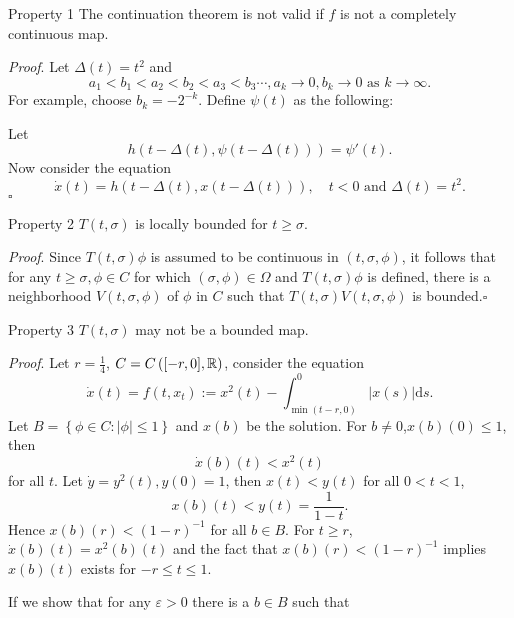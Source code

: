\begin{frame}[t]
  \begin{alertblock}{Property 1}
     The continuation theorem is not valid if $f$ is not a completely continuous map.
   \end{alertblock}
   {\noindent\itshape Proof}.
   Let $\Delta(t)=t^2$ and 
   \[
   a_1<b_1<a_2<b_2<a_3<b_3\cdots, a_k\to 0, b_k\to 0 \text{ as }k\to \infty.
   \] 
   For example, choose $b_k=-2^{-k}$.
   Define $\psi(t)$ as the following:
   \begin{figure}
     \centering
   \end{figure}
 \end{frame}
 \begin{frame}[t]
   Let 
   \[
     h(t-\Delta(t),\psi(t-\Delta(t)))=\psi'(t).
   \] 
   Now consider the equation 
   \[
     \dot{x}(t)=h(t-\Delta(t),x(t-\Delta(t))),\quad t<0 \text{ and }\Delta(t)=t^2.
   \] 
   \hfill $\square$\par
\end{frame}
\begin{frame}[t]
  \begin{alertblock}{Property 2}
    $T(t,\sigma)$ is locally bounded for $t\ge \sigma$.
  \end{alertblock}
 {\noindent \itshape Proof}.
 Since $T(t,\sigma)\phi$ is assumed to be continuous in $(t,\sigma,\phi)$, it follows that for any $t\ge \sigma,\phi \in C$ for which $(\sigma,\phi) \in \Omega$ and $T(t,\sigma)\phi$ is defined, there is a neighborhood $V(t,\sigma,\phi)$ of $\phi$ in $C$ such that $T(t,\sigma)V(t,\sigma,\phi)$ is bounded.\hfill $\square$\par
\end{frame}
  \begin{frame}[t]
    \begin{alertblock}{Property 3}
    $T(t,\sigma)$ may not be a bounded map.
    \end{alertblock}
    {\noindent \itshape Proof}.
    Let $r=\frac{1}{4}$, $C=C\left( [-r,0],\mathbb{R} \right) $, consider the equation
    \begin{equation}\label{prp-5}
      \dot{x}(t)=f(t,x_t):=x^2(t)-\int_{\min(t-r,0)}^{0}|x(s)|\mathrm{d}s.
    \end{equation}
    Let $B=\left\{\phi \in C:|\phi|\le 1\right\} $ and  $x(b)$ be the solution. For $b\neq 0$,$x(b)(0)\le 1$, then 
    \[
      \dot{x}(b)(t)<x^2(t)
    \] 
    for all $t$. Let $\dot{y}=y^2(t),y(0)=1$, then $x(t)<y(t)$ for all $0<t<1$,
    \[
      x(b)(t)<y(t)=\frac{1}{1-t}.
    \] 
    Hence $x(b)(r)<(1-r)^{-1}$ for all $b\in B$. For $t\ge r$, $\dot{x}(b)(t)=x^2(b)(t)$ and the fact that $x(b)(r)<(1-r)^{-1}$ implies $x(b)(t)$ exists for $-r\le t\le 1$.

    If we show that for any  $\varepsilon >0$ there is a $b\in B$ such that
  \end{frame}
  

